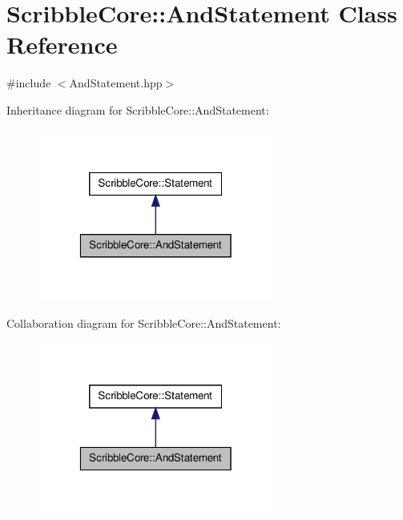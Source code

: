 \hypertarget{class_scribble_core_1_1_and_statement}{\section{Scribble\-Core\-:\-:And\-Statement Class Reference}
\label{class_scribble_core_1_1_and_statement}
}


{\ttfamily \#include $<$And\-Statement.\-hpp$>$}



Inheritance diagram for Scribble\-Core\-:\-:And\-Statement\-:\nopagebreak
\begin{figure}[H]
\begin{center}
\leavevmode
\includegraphics[width=220pt]{class_scribble_core_1_1_and_statement__inherit__graph}
\end{center}
\end{figure}


Collaboration diagram for Scribble\-Core\-:\-:And\-Statement\-:\nopagebreak
\begin{figure}[H]
\begin{center}
\leavevmode
\includegraphics[width=220pt]{class_scribble_core_1_1_and_statement__coll__graph}
\end{center}
\end{figure}
